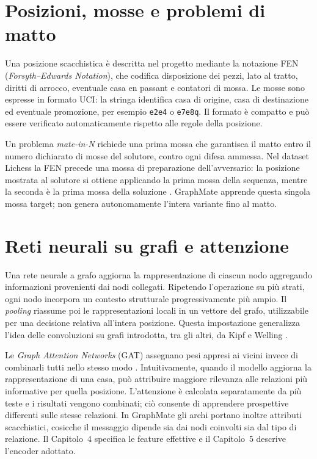 \label{chap:background}

\section{Posizioni, mosse e problemi di matto}

Una posizione scacchistica è descritta nel progetto mediante la notazione FEN
(\textit{Forsyth--Edwards Notation}), che codifica disposizione dei pezzi, lato al
tratto, diritti di arrocco, eventuale casa en passant e contatori di mossa. Le mosse
sono espresse in formato UCI: la stringa identifica casa di origine, casa di
destinazione ed eventuale promozione, per esempio \texttt{e2e4} o
\texttt{e7e8q}. Il formato è compatto e può essere verificato automaticamente
rispetto alle regole della posizione.

Un problema \textit{mate-in-N} richiede una prima mossa che garantisca il matto
entro il numero dichiarato di mosse del solutore, contro ogni difesa ammessa. Nel
dataset Lichess la FEN precede una mossa di preparazione dell'avversario: la
posizione mostrata al solutore si ottiene applicando la prima mossa della sequenza,
mentre la seconda è la prima mossa della soluzione
\cite{lichessOpenDatabase}. GraphMate apprende questa singola mossa target; non
genera autonomamente l'intera variante fino al matto.

\section{Reti neurali su grafi e attenzione}

Una rete neurale a grafo aggiorna la rappresentazione di ciascun nodo aggregando
informazioni provenienti dai nodi collegati. Ripetendo l'operazione su più strati,
ogni nodo incorpora un contesto strutturale progressivamente più ampio. Il
\textit{pooling} riassume poi le rappresentazioni locali in un vettore del grafo,
utilizzabile per una decisione relativa all'intera posizione. Questa impostazione
generalizza l'idea delle convoluzioni su grafi introdotta, tra gli altri, da
Kipf e Welling \cite{kipf2017semi}.

Le \textit{Graph Attention Networks} (GAT) assegnano pesi appresi ai vicini invece
di combinarli tutti nello stesso modo \cite{velickovic2018graph}. Intuitivamente,
quando il modello aggiorna la rappresentazione di una casa, può attribuire maggiore
rilevanza alle relazioni più informative per quella posizione. L'attenzione è
calcolata separatamente da più teste e i risultati vengono combinati; ciò consente
di apprendere prospettive differenti sulle stesse relazioni. In GraphMate gli archi
portano inoltre attributi scacchistici, cosicche il messaggio dipende sia dai nodi
coinvolti sia dal tipo di relazione. Il Capitolo~4 specifica le feature effettive e
il Capitolo~5 descrive l'encoder adottato.

